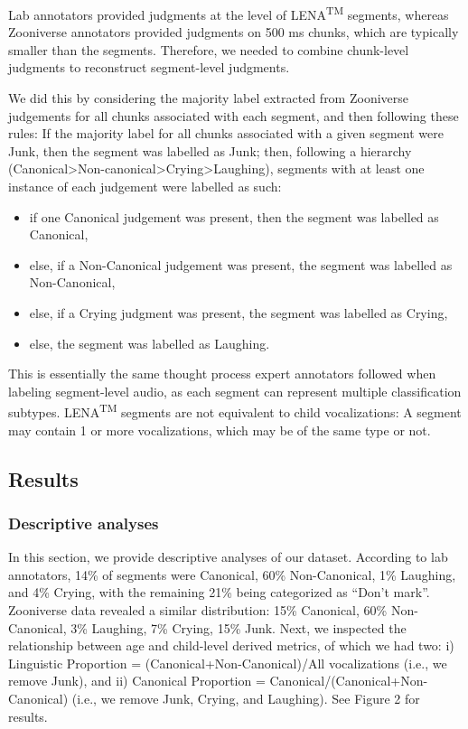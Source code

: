 \documentclass[english,,man,floatsintext]{apa6}
\providecommand{\tightlist}{%
  \setlength{\itemsep}{0pt}\setlength{\parskip}{0pt}}
\begin{document}
Lab annotators provided judgments at the level of LENA\textsuperscript{TM} segments, whereas Zooniverse annotators provided judgments on 500 ms chunks, which are typically smaller than the segments. Therefore, we needed to combine chunk-level judgments to reconstruct segment-level judgments.

We did this by considering the majority label extracted from Zooniverse judgements for all chunks associated with each segment, and then following these rules: If the majority label for all chunks associated with a given segment were Junk, then the segment was labelled as Junk; then, following a hierarchy (Canonical\textgreater{}Non-canonical\textgreater{}Crying\textgreater{}Laughing), segments with at least one instance of each judgement were labelled as such:

\begin{itemize}
\tightlist
\item
  if one Canonical judgement was present, then the segment was labelled as Canonical,
\item
  else, if a Non-Canonical judgement was present, the segment was labelled as Non-Canonical,
\item
  else, if a Crying judgment was present, the segment was labelled as Crying,
\item
  else, the segment was labelled as Laughing.
\end{itemize}

This is essentially the same thought process expert annotators followed when labeling segment-level audio, as each segment can represent multiple classification subtypes. LENA\textsuperscript{TM} segments are not equivalent to child vocalizations: A segment may contain 1 or more vocalizations, which may be of the same type or not.

\hypertarget{results}{%
\subsection{Results}\label{results}}

\hypertarget{descriptive-analyses}{%
\subsubsection{Descriptive analyses}\label{descriptive-analyses}}

In this section, we provide descriptive analyses of our dataset. According to lab annotators, 14\% of segments were Canonical, 60\% Non-Canonical, 1\% Laughing, and 4\% Crying, with the remaining 21\% being categorized as \enquote{Don't mark}. Zooniverse data revealed a similar distribution: 15\% Canonical, 60\% Non-Canonical, 3\% Laughing, 7\% Crying, 15\% Junk.
Next, we inspected the relationship between age and child-level derived metrics, of which we had two: i) Linguistic Proportion = (Canonical+Non-Canonical)/All vocalizations (i.e., we remove Junk), and ii) Canonical Proportion = Canonical/(Canonical+Non-Canonical) (i.e., we remove Junk, Crying, and Laughing). See Figure 2 for results.
\end{document}
